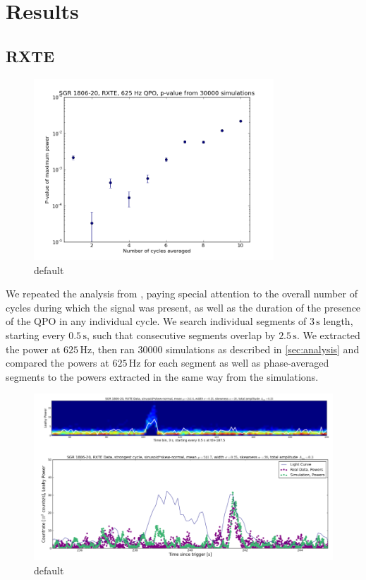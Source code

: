 \documentclass{emulateapj}
\begin{document}
\section{Results}
\label{sec:results}

\subsection{RXTE}
\label{sec:rxte_results}

\begin{figure}[htbp]
\begin{center}
\includegraphics[width=9cm]{1806_rxte_pvals.png}
\caption{default}
\label{fig:rxte_pvals}
\end{center}
\end{figure}



We repeated the analysis from \citealt{Strohmayer06}, paying special attention to the overall number of cycles during which the signal was present, as well as the duration of the presence of the QPO in any individual cycle.
We search individual segments of $3 \, \mathrm{s}$ length, starting every $0.5 \, \mathrm{s}$, such that consecutive segments overlap by $2.5 \, \mathrm{s}$. We extracted the power at $625 \, \mathrm{Hz}$, then ran 30000 simulations as described in \ref{sec:analysis} and compared the powers at $625 \, \mathrm{Hz}$ for each segment as well as phase-averaged segments to the powers extracted in the same way from the simulations.

\begin{figure}[htbp]
\begin{center}
\includegraphics[width=\textwidth]{1806_rxte_lc_combined.png}
\caption{default}
\label{fig:rxte_combined}
\end{center}
\end{figure}
\end{document}
